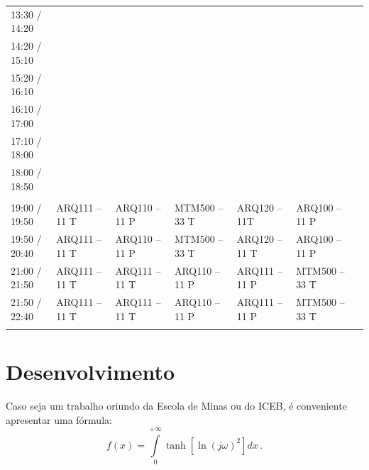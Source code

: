 \documentclass[
	12pt,				%
	openright,			%
	oneside,			%
	a4paper,			%
	english,			%
	brazil				%
	]{abntex2}
\begin{document}
\begin{landscape}
\begin{table}[p]
{\begin{tabular}{lllllll}
				13:30 / 14:20 &               &               &                         &                                      &               &  \\
				14:20 / 15:10 &               &               &                         &                                      &               &  \\
				15:20 / 16:10 &               &               &                         &                                      &               &  \\
				16:10 / 17:00 &               &               &                         &                                      &               &  \\
				17:10 / 18:00 &               &               & {\color[HTML]{FF0000} } &                                      &               &  \\
				18:00 / 18:50 &               &               & {\color[HTML]{FF0000} } &                                      &               &  \\
				\multicolumn{7}{l}{\cellcolor[HTML]{D9D9D9}}                                                                                      \\
				19:00 / 19:50 & ARQ111 – 11 T & ARQ110 – 11 P & MTM500 – 33 T           & {\color[HTML]{434343} ARQ120 – 11T}  & ARQ100 – 11 P &  \\
				19:50 / 20:40 & ARQ111 – 11 T & ARQ110 – 11 P & MTM500 – 33 T           & {\color[HTML]{434343} ARQ120 – 11 T} & ARQ100 – 11 P &  \\
				21:00 / 21:50 & ARQ111 – 11 T & ARQ111 – 11 T & ARQ110 – 11 P           & ARQ111 – 11 P                        & MTM500 – 33 T &  \\
				21:50 / 22:40 & ARQ111 – 11 T & ARQ111 – 11 T & ARQ110 – 11 P           & ARQ111 – 11 P                        & MTM500 – 33 T &  \\
				\multicolumn{7}{l}{\cellcolor[HTML]{D9D9D9}}                                                                                     
			\end{tabular}%
		}
	\end{table}
\end{landscape}
\chapter{Desenvolvimento} \label{cap:desenvolvimento}

Caso seja um trabalho oriundo da Escola de Minas ou do ICEB, é conveniente apresentar uma fórmula:
\begin{equation}
f(x) = \int \limits_{0}^{+ \infty} \tanh \left[\ln (j \omega)^2 \right] dx \,. \label{eq:01}
\end{equation}
\end{document}
